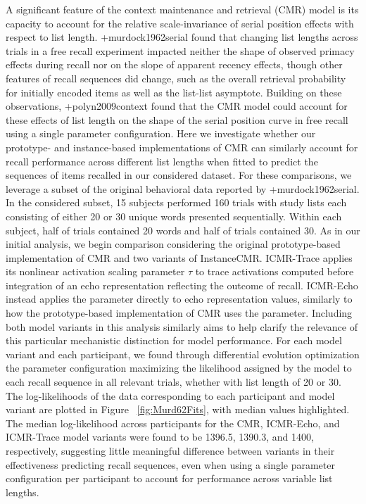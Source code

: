 A significant feature of the context maintenance and retrieval (CMR) model is its capacity to account for the relative scale-invariance of serial position effects with respect to list length. +{}{}{murdock1962serial} found that changing list lengths across trials in a free recall experiment impacted neither the shape of observed primacy effects during recall nor on the slope of apparent recency effects, though other features of recall sequences did change, such as the overall retrieval probability for initially encoded items as well as the list-list asymptote. Building on these observations, +{}{}{polyn2009context} found that the CMR model could account for these effects of list length on the shape of the serial position curve in free recall using a single parameter configuration.\markdownRendererInterblockSeparator
{}Here we investigate whether our prototype- and instance-based implementations of CMR can similarly account for recall performance across different list lengths when fitted to predict the sequences of items recalled in our considered dataset. For these comparisons, we leverage a subset of the original behavioral data reported by +{}{}{murdock1962serial}. In the considered subset, 15 subjects performed 160 trials with study lists each consisting of either 20 or 30 unique words presented sequentially. Within each subject, half of trials contained 20 words and half of trials contained 30.\markdownRendererInterblockSeparator
{}As in our initial analysis, we begin comparison considering the original prototype-based implementation of CMR and two variants of InstanceCMR. ICMR-Trace applies its nonlinear activation scaling parameter $\tau$ to trace activations computed before integration of an echo representation reflecting the outcome of recall. ICMR-Echo instead applies the parameter directly to echo representation values, similarly to how the prototype-based implementation of CMR uses the parameter. Including both model variants in this analysis similarly aims to help clarify the relevance of this particular mechanistic distinction for model performance.\markdownRendererInterblockSeparator
{}For each model variant and each participant, we found through differential evolution optimization the parameter configuration maximizing the likelihood assigned by the model to each recall sequence in all relevant trials, whether with list length of 20 or 30. The log-likelihoods of the data corresponding to each participant and model variant are plotted in Figure ~\ref{fig:Murd62Fits}, with median values highlighted. The median log-likelihood across participants for the CMR, ICMR-Echo, and ICMR-Trace model variants were found to be 1396.5, 1390.3, and 1400, respectively, suggesting little meaningful difference between variants in their effectiveness predicting recall sequences, even when using a single parameter configuration per participant to account for performance across variable list lengths.\markdownRendererInterblockSeparator
